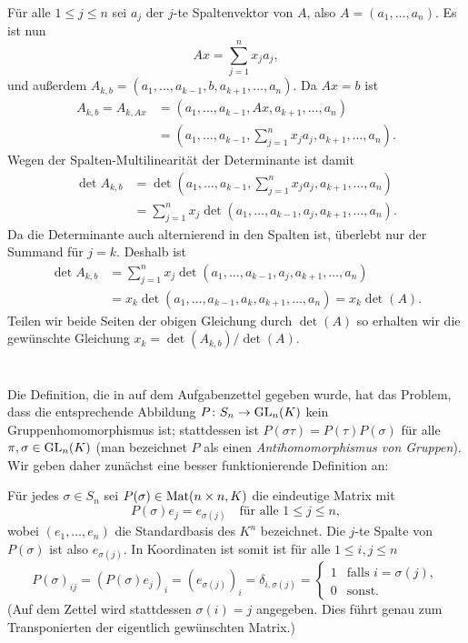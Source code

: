 \documentclass[a4paper,10pt]{article}
\begin{document}
Für alle $1 \leq j \leq n$ sei $a_j$ der $j$-te Spaltenvektor von $A$, also $A = (a_1, \dotsc, a_n)$. Es ist nun
\[
 Ax = \sum_{j=1}^n x_j a_j,
\]
und außerdem $A_{k,b} = (a_1, \dotsc, a_{k-1}, b, a_{k+1}, \dotsc, a_n)$. Da $Ax = b$ ist
\begin{align*}
 A_{k,b}
 = A_{k,Ax}
 &= (a_1, \dotsc, a_{k-1}, Ax, a_{k+1}, \dotsc, a_n) \\
 &= \left( a_1, \dotsc, a_{k-1}, \sum_{j=1}^n x_j a_j, a_{k+1}, \dotsc, a_n \right).
\end{align*}
Wegen der Spalten-Multilinearität der Determinante ist damit
\begin{align*}
 \det A_{k,b}
 &= \det \left( a_1, \dotsc, a_{k-1}, \sum_{j=1}^n x_j a_j, a_{k+1}, \dotsc, a_n \right) \\
 &= \sum_{j=1}^n x_j \det \left( a_1, \dotsc, a_{k-1}, a_j, a_{k+1}, \dotsc, a_n \right).
\end{align*}
Da die Determinante auch alternierend in den Spalten ist, überlebt nur der Summand für $j = k$. Deshalb ist
\begin{align*}
 \det A_{k,b}
 &= \sum_{j=1}^n x_j \det \left( a_1, \dotsc, a_{k-1}, a_j, a_{k+1}, \dotsc, a_n \right) \\
 &= x_k \det \left( a_1, \dotsc, a_{k-1}, a_k, a_{k+1}, \dotsc, a_n \right)
 = x_k \det(A).
\end{align*}
Teilen wir beide Seiten der obigen Gleichung durch $\det(A)$ so erhalten wir die gewünschte Gleichung $x_k = \det(A_{k,b})/\det(A)$.





\section{}
Die Definition, die in auf dem Aufgabenzettel gegeben wurde, hat das Problem, dass die entsprechende Abbildung $P \colon S_n \to \mathrm{GL}_n(K)$ kein Gruppenhomomorphismus ist; stattdessen ist $P(\sigma \tau) = P(\tau) P(\sigma)$ für alle $\pi, \sigma \in \mathrm{GL}_n(K)$ (man bezeichnet $P$ als einen \emph{Antihomomorphismus von Gruppen}). Wir geben daher zunächst eine besser funktionierende Definition an:

Für jedes $\sigma \in S_n$ sei $P(\sigma) \in \mathrm{Mat}(n \times n, K)$ die eindeutige Matrix mit
\[
 P(\sigma) e_j = e_{\sigma(j)}
 \quad\text{für alle $1 \leq j \leq n$},
\]
wobei $(e_1, \dotsc, e_n)$ die Standardbasis des $K^n$ bezeichnet. Die $j$-te Spalte von $P(\sigma)$ ist also $e_{\sigma(j)}$. In Koordinaten ist somit ist für alle $1 \leq i,j \leq n$
\[
 P(\sigma)_{ij}
 = (P(\sigma)e_j)_i
 = (e_{\sigma(j)})_i
 = \delta_{i,\sigma(j)}
 =
 \begin{cases}
  1 & \text{falls $i = \sigma(j)$}, \\
  0 & \text{sonst}.
 \end{cases}
\]
(Auf dem Zettel wird stattdessen $\sigma(i) = j$ angegeben. Dies führt genau zum Transponierten der eigentlich gewünschten Matrix.)
\end{document}
